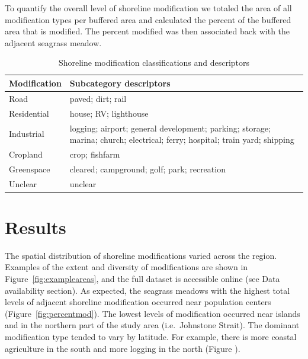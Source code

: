 \documentclass[12pt]{article}\usepackage[]{graphicx}\usepackage[]{color}
\begin{document}
To quantify the overall level of shoreline modification we totaled the area of all modification types per buffered area and calculated the percent of the buffered area that is modified. The percent modified was then associated back with the adjacent seagrass meadow.
\begin{table}[h]

\caption{\label{tab:modifications}Shoreline modification classifications and descriptors}
\centering
\fontsize{9}{11}\selectfont
\begin{tabular}[t]{>{\centering\arraybackslash}m{10em}>{\raggedright\arraybackslash}m{30em}}
\toprule
\textbf{Modification} & \textbf{Subcategory descriptors}\\
\midrule
Road & paved; dirt; rail\\
\addlinespace
Residential & house; RV; lighthouse\\
\addlinespace
Industrial & logging; airport; general development; parking; storage; marina; church; electrical; ferry; hospital; train yard; shipping\\
\addlinespace
Cropland & crop; fishfarm\\
\addlinespace
Greenspace & cleared; campground; golf; park; recreation\\
\addlinespace
Unclear & unclear\\
\bottomrule
\end{tabular}
\end{table}
\hypertarget{results}{%
\section{Results}\label{results}}

The spatial distribution of shoreline modifications varied across the region. Examples of the extent and diversity of modifications are shown in Figure~\ref{fig:exampleareas}, and the full dataset is accessible online (see Data availability section). As expected, the seagrass meadows with the highest total levels of adjacent shoreline modification occurred near population centers (Figure~\ref{fig:percentmod}). The lowest levels of modification occurred near islands and in the northern part of the study area (i.e.~Johnstone Strait). The dominant modification type tended to vary by latitude. For example, there is more coastal agriculture in the south and more logging in the north (Figure ).
\end{document}
